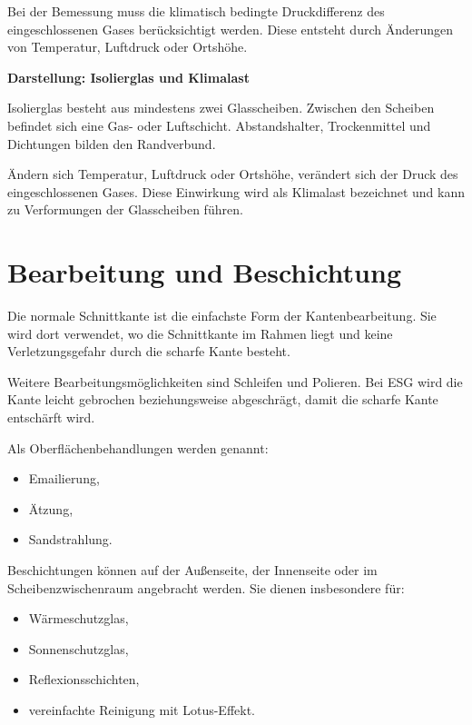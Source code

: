 \documentclass[
  12pt,
  a4paper,
  oneside
]{scrreprt}
\begin{document}
Bei der Bemessung muss die klimatisch bedingte Druckdifferenz des
eingeschlossenen Gases berücksichtigt werden. Diese entsteht durch
Änderungen von Temperatur, Luftdruck oder Ortshöhe. 

\begin{darstellungsbox}
\textbf{Darstellung: Isolierglas und Klimalast}

Isolierglas besteht aus mindestens zwei Glasscheiben. Zwischen den
Scheiben befindet sich eine Gas- oder Luftschicht. Abstandshalter,
Trockenmittel und Dichtungen bilden den Randverbund.

Ändern sich Temperatur, Luftdruck oder Ortshöhe, verändert sich der
Druck des eingeschlossenen Gases. Diese Einwirkung wird als
Klimalast bezeichnet und kann zu Verformungen der Glasscheiben führen.
\end{darstellungsbox}

\section{Bearbeitung und Beschichtung}

Die normale Schnittkante ist die einfachste Form der Kantenbearbeitung.
Sie wird dort verwendet, wo die Schnittkante im Rahmen liegt und keine
Verletzungsgefahr durch die scharfe Kante besteht. 

Weitere Bearbeitungsmöglichkeiten sind Schleifen und Polieren. Bei ESG
wird die Kante leicht gebrochen beziehungsweise abgeschrägt, damit die
scharfe Kante entschärft wird. 

Als Oberflächenbehandlungen werden genannt:

\begin{itemize}
  \item Emailierung,
  \item Ätzung,
  \item Sandstrahlung.
\end{itemize}



Beschichtungen können auf der Außenseite, der Innenseite oder im
Scheibenzwischenraum angebracht werden. Sie dienen insbesondere für:

\begin{itemize}
  \item Wärmeschutzglas,
  \item Sonnenschutzglas,
  \item Reflexionsschichten,
  \item vereinfachte Reinigung mit Lotus-Effekt.
\end{itemize}
\end{document}

